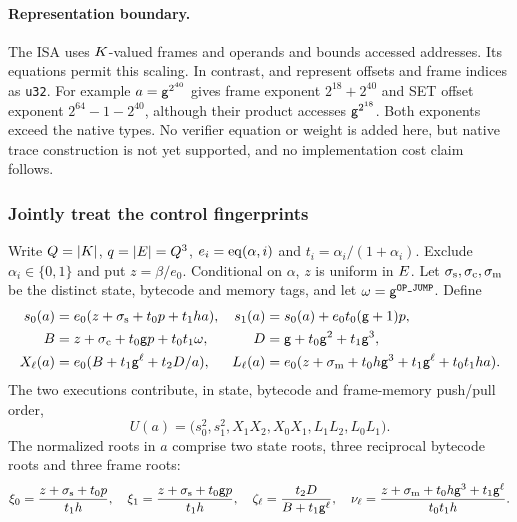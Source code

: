 \paragraph{Representation boundary.} The ISA uses $K$-valued frames and operands and bounds accessed addresses. Its equations permit this scaling. In contrast,  and  represent offsets and frame indices as \texttt{u32}. For example $a=\mathsf{g}^{2^{40}}$ gives frame exponent $2^{18}+2^{40}$ and SET offset exponent $2^{64}-1-2^{40}$, although their product accesses $\mathsf{g}^{2^{18}}$. Both exponents exceed the native types. No verifier equation or weight is added here, but native trace construction is not yet supported, and no implementation cost claim follows.

\subsubsection{Jointly treat the control fingerprints}

Write $Q=|K|$, $q=|E|=Q^3$, $e_i=\operatorname{eq}(\alpha,i)$ and $t_i=\alpha_i/(1+\alpha_i)$. Exclude $\alpha_i\in\{0,1\}$ and put $z=\beta/e_0$. Conditional on $\alpha$, $z$ is uniform in $E$. Let $\sigma_{\rm s},\sigma_{\rm c},\sigma_{\rm m}$ be the distinct state, bytecode and memory tags, and let $\omega=\mathsf{g}^{\texttt{OP\_JUMP}}$. Define
\[
\begin{aligned}
 s_0(a)&=e_0(z+\sigma_{\rm s}+t_0p+t_1ha),&
 s_1(a)&=s_0(a)+e_0t_0(\mathsf{g}+1)p,\\
 B&=z+\sigma_{\rm c}+t_0\mathsf{g} p+t_0t_1\omega,&
 D&=\mathsf{g}+t_0\mathsf{g}^2+t_1\mathsf{g}^3,\\
 X_\ell(a)&=e_0(B+t_1\mathsf{g}^\ell+t_2D/a),&
 L_\ell(a)&=e_0(z+\sigma_{\rm m}+t_0h\mathsf{g}^3+t_1\mathsf{g}^\ell+t_0t_1ha).
\end{aligned}
\]
The two executions contribute, in state, bytecode and frame-memory push/pull order,
\[
 U(a)=\bigl(s_0^2,s_1^2,X_1X_2,X_0X_1,L_1L_2,L_0L_1\bigr).
\]
The normalized roots in $a$ comprise two state roots, three reciprocal bytecode roots and three frame roots:
\[
 \xi_0=\frac{z+\sigma_{\rm s}+t_0p}{t_1h},\quad
 \xi_1=\frac{z+\sigma_{\rm s}+t_0\mathsf{g} p}{t_1h},\quad
 \zeta_\ell=\frac{t_2D}{B+t_1\mathsf{g}^\ell},\quad
 \nu_\ell=\frac{z+\sigma_{\rm m}+t_0h\mathsf{g}^3+t_1\mathsf{g}^\ell}{t_0t_1h}.
\]

